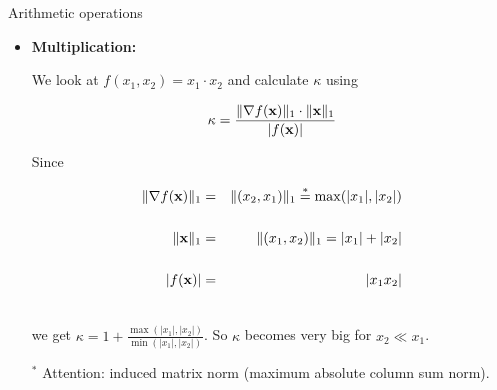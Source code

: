 \documentclass[11pt,compress,t,notes=noshow, xcolor=table]{beamer}
\begin{document}
\begin{vbframe}{Arithmetic operations}

\begin{itemize}

 \item \textbf{Multiplication:}

We look at $f(x_1, x_2) = x_1 \cdot x_2$ and calculate $\kappa$ using

$$
\kappa = \frac{\|\nabla f(\mathbf{x})\|_1 \cdot \|\mathbf{x}\|_1}{|f(\mathbf{x})|}
$$

Since

\vspace*{-.5cm}

\begin{eqnarray*}
\|\nabla f(\mathbf{x})\|_1 &=& \|(x_2, x_1)\|_1 \overset{*}{=} \max (|x_1|, |x_2|)\\\\
\|\mathbf{x}\|_1 &=& \|(x_1, x_2)\|_1 = |x_1| + |x_2| \\\\
|f(\mathbf{x})| &=& |x_1 x_2|\\\
\end{eqnarray*}

\vspace*{-.5cm}

we get $\kappa = 1 + \frac{\max(|x_1|, |x_2|)}{\min(|x_1|, |x_2|)}$. So $\kappa$ becomes very big for $x_2 \ll x_1$.


\begin{footnotesize}
$^*$ Attention: induced matrix norm (maximum absolute column sum norm).
\end{footnotesize}

 \framebreak

%
%
%


%
%
%
%


\end{itemize}
\end{vbframe}
\end{document}
